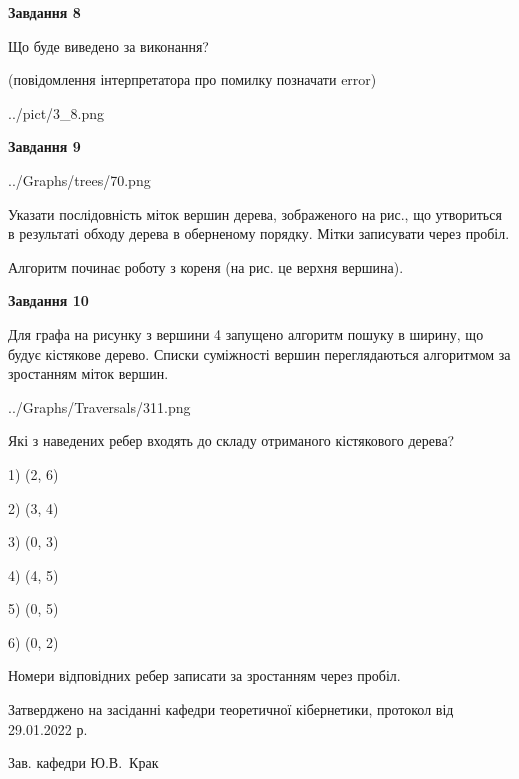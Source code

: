 \documentclass[12pt, ukrainian]{article}
\begin{document}
{\begin {large}
{\begin {center}\textbf{Завдання 8}\end {center}}\par
Що буде виведено за виконання?\par
 (повідомлення інтерпретатора про помилку позначати error)\par
\begin{center}
	{../pict/3_8.png}
\end{center}
\newpage

{\begin {center}\textbf{Завдання 9}\end {center}}\par

\begin{center}
	{../Graphs/trees/70.png}
\end{center}
Указати послідовність міток вершин дерева, зображеного на рис., що утвориться в результаті обходу дерева в оберненому порядку. Мітки записувати через пробіл.\par Алгоритм починає роботу з кореня (на рис. це верхня вершина).\par
\newpage

{\begin {center}\textbf{Завдання 10}\end {center}}\par
Для графа на рисунку з вершини 4 запущено алгоритм пошуку в ширину, що будує кістякове дерево. Списки суміжності вершин переглядаються алгоритмом за зростанням міток вершин.\par
\begin{center}
	{../Graphs/Traversals/311.png}
\end{center}
\par Які з наведених ребер входять до складу отриманого кістякового дерева?\par
1) (2, 6)\par
2) (3, 4)\par
3) (0, 3)\par
4) (4, 5)\par
5) (0, 5)\par
6) (0, 2)\par
{\vskip 15pt} Номери відповідних ребер записати за зростанням через пробіл.\par
\newpage


\end {large}
}
{\smallskip \begin {small} Затверджено на засіданні кафедри теоретичної кібернетики, протокол  від   29.01.2022 р.\par\smallskip\smallskip
{\parbox {6.5 cm}{Зав. кафедри \dotfill Ю.В.~Крак}} \end{small}}
\end{document}
